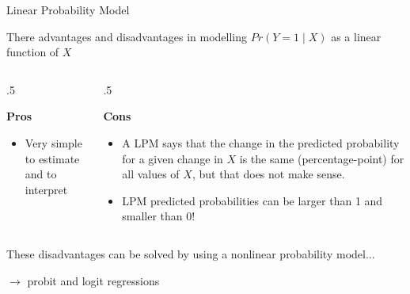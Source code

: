 \documentclass[notes,10pt, aspectratio=169]{beamer}
\begin{document}
\begin{frame}{Linear Probability Model}

There advantages and disadvantages in modelling $Pr(Y=1\mid X)$ as a linear function of $X$
\begin{columns} 
    \begin{column}{.5\textwidth}
        \begin{center}
            \textbf{Pros}
        \end{center}
        \begin{itemize}
            \item Very simple to estimate and to interpret
        \end{itemize}
    \end{column}
    \begin{column}{.5\textwidth}
        \begin{center}
            \textbf{Cons}
        \end{center}
        \begin{itemize}
        \setcounter{enumi}{7}
            \item A LPM says that the change in the predicted probability for a given change in $X$ is the same (percentage-point) for all values of $X$, but that does not make sense.
            \item LPM predicted probabilities can be larger than 1 and smaller than 0!

        \end{itemize}

    \end{column}
\end{columns}
\vspace{2em}

These disadvantages can be solved by using a nonlinear probability model...\\
\begin{center}
    $\longrightarrow$ probit and logit regressions
\end{center}
\end{frame}
\end{document}
